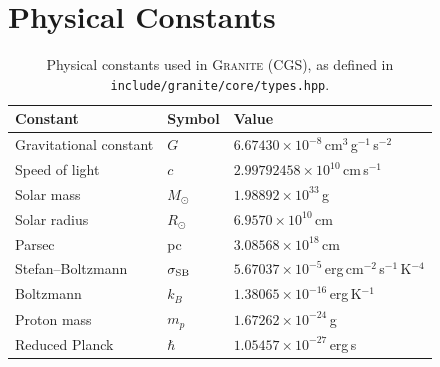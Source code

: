 \documentclass[aps,prd,twocolumn,superscriptaddress,nofootinbib,showpacs,
               longbibliography]{revtex4-2}
\newcommand{\granite}{\textsc{Granite}}
\newcommand{\code}[1]{\texttt{#1}}
\begin{document}
\section{Physical Constants}
\label{app:constants}

\begin{table}[h]
\caption{Physical constants used in \granite{} (CGS), as defined in
  \code{include/granite/core/types.hpp}.}
\label{tab:constants}
\begin{ruledtabular}
\begin{tabular}{lll}
  Constant & Symbol & Value \\ \hline
  Gravitational constant & $G$ & $6.67430\times10^{-8}$\,cm$^3$\,g$^{-1}$\,s$^{-2}$ \\
  Speed of light & $c$ & $2.99792458\times10^{10}$\,cm\,s$^{-1}$ \\
  Solar mass & $M_\odot$ & $1.98892\times10^{33}$\,g \\
  Solar radius & $R_\odot$ & $6.9570\times10^{10}$\,cm \\
  Parsec & pc & $3.08568\times10^{18}$\,cm \\
  Stefan--Boltzmann & $\sigma_{\rm SB}$ & $5.67037\times10^{-5}$\,erg\,cm$^{-2}$\,s$^{-1}$\,K$^{-4}$ \\
  Boltzmann & $k_B$ & $1.38065\times10^{-16}$\,erg\,K$^{-1}$ \\
  Proton mass & $m_p$ & $1.67262\times10^{-24}$\,g \\
  Reduced Planck & $\hbar$ & $1.05457\times10^{-27}$\,erg\,s \\
\end{tabular}
\end{ruledtabular}
\end{table}
\end{document}
